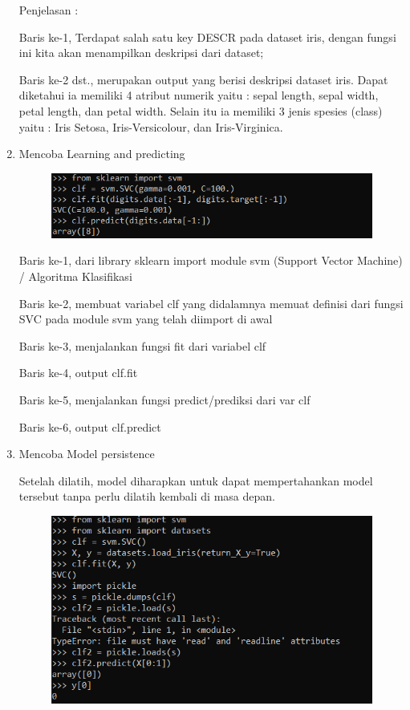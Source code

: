 \begin{enumerate}
\begin{figure}[!htbp]
    \label{Figure}
    \end{figure}
    \par
    Penjelasan :
    \par
    Baris ke-1, Terdapat salah satu key DESCR pada dataset iris, dengan fungsi ini kita akan menampilkan deskripsi dari dataset;
    \par
    Baris ke-2 dst., merupakan output yang berisi deskripsi dataset iris. Dapat diketahui ia memiliki 4 atribut numerik yaitu : sepal length, sepal width, petal length, dan petal width. Selain itu ia memiliki 3 jenis spesies (class) yaitu : Iris Setosa, Iris-Versicolour, dan Iris-Virginica.
    \newpage
    \item Mencoba Learning and predicting
    \begin{figure}[!htbp]
    \centering
    \includegraphics[scale=1]{figures/Learningandpredict/1.PNG}
    \label{Figure}
    \end{figure}
    \par
    Baris ke-1, dari library sklearn import module svm (Support Vector Machine) / Algoritma Klasifikasi
    \par
    Baris ke-2, membuat variabel clf yang didalamnya memuat definisi dari fungsi SVC pada module svm yang telah diimport di awal
    \par
    Baris ke-3, menjalankan fungsi fit dari variabel clf
    \par
    Baris ke-4, output clf.fit
    \par
    Baris ke-5, menjalankan fungsi predict/prediksi dari var clf
    \par
    Baris ke-6, output clf.predict
    \item Mencoba Model persistence
    \par
    Setelah dilatih, model diharapkan untuk dapat mempertahankan model tersebut tanpa perlu dilatih kembali di masa depan. 
    \begin{figure}[!htbp]
    \centering
    \includegraphics[scale=1]{figures/Modelpersistence/1.PNG}   \label{Figure}

\end{figure}
\end{enumerate}

